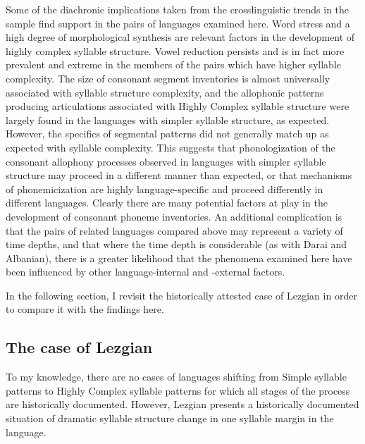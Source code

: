   Some of the diachronic implications taken from the crosslinguistic trends in the sample find support in the pairs of languages examined here. Word stress and a high degree of morphological synthesis are relevant factors in the development of highly complex syllable structure. Vowel reduction persists and is in fact more prevalent and extreme in the members of the pairs which have higher syllable complexity. The size of consonant segment inventories is almost universally associated with syllable structure complexity, and the allophonic patterns producing articulations associated with Highly Complex syllable structure were largely found in the languages with simpler syllable structure, as expected. However, the specifics of segmental patterns did not generally match up as expected with syllable complexity. This suggests that phonologization of the consonant allophony processes observed in languages with simpler syllable structure may proceed in a different manner than expected, or that mechanisms of phonemicization are highly language-specific and proceed differently in different languages. Clearly there are many potential factors at play in the development of consonant phoneme inventories. An additional complication is that the pairs of related languages compared above may represent a variety of time depths, and that where the time depth is considerable (as with Darai and Albanian), there is a greater likelihood that the phenomena examined here have been influenced by other language-internal and -external factors.

  In the following section, I revisit the historically attested case of Lezgian in order to compare it with the findings here.

\subsection{The case of Lezgian}\label{sec:8.4.4}

  To my knowledge, there are no cases of languages shifting from Simple syllable patterns to Highly Complex syllable patterns for which all stages of the process are historically documented. However, Lezgian presents a historically documented situation of dramatic syllable structure change in one syllable margin in the language.

